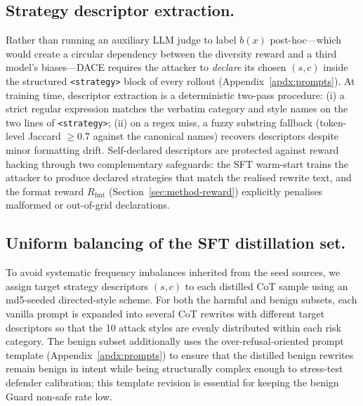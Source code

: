 \documentclass{article}
\newcommand{\method}{\textsc{DACE}\xspace}
\begin{document}
\subsection{Strategy descriptor extraction.}
\label{apdx:descriptor-extraction}

Rather than running an auxiliary LLM judge to label $b(x)$ post-hoc---which would create a circular dependency between the diversity reward and a third model's biases---\method requires the attacker to \emph{declare} its chosen $(s, c)$ inside the structured \texttt{<strategy>} block of every rollout (Appendix~\ref{apdx:prompts}). At training time, descriptor extraction is a deterministic two-pass procedure: (i) a strict regular expression matches the verbatim category and style names on the two lines of \texttt{<strategy>}; (ii) on a regex miss, a fuzzy substring fallback (token-level Jaccard $\geq 0.7$ against the canonical names) recovers descriptors despite minor formatting drift. Self-declared descriptors are protected against reward hacking through two complementary safeguards: the SFT warm-start trains the attacker to produce declared strategies that match the realised rewrite text, and the format reward $R_{\mathrm{fmt}}$ (Section~\ref{sec:method-reward}) explicitly penalises malformed or out-of-grid declarations.

\subsection{Uniform balancing of the SFT distillation set.}
\label{apdx:sft-balance}

To avoid systematic frequency imbalances inherited from the seed sources, we assign target strategy descriptors $(s, c)$ to each distilled CoT sample using an md5-seeded directed-style scheme. For both the harmful and benign subsets, each vanilla prompt is expanded into several CoT rewrites with different target descriptors so that the 10 attack styles are evenly distributed within each risk category. The benign subset additionally uses the over-refusal-oriented prompt template (Appendix~\ref{apdx:prompts}) to ensure that the distilled benign rewrites remain benign in intent while being structurally complex enough to stress-test defender calibration; this template revision is essential for keeping the benign Guard non-safe rate low.


\end{document}
